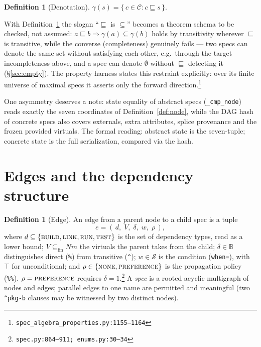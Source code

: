 \documentclass[11pt]{article}
\theoremstyle{definition}
\newtheorem{definition}[theorem]{Definition}
\theoremstyle{remark}
\newcommand{\sat}{\sqsubseteq}
\newcommand{\den}[1]{\gamma(#1)}
\newcommand{\Spec}{\mathcal{S}}
\newcommand{\Conc}{\mathcal{C}}
\newcommand{\Names}{\mathit{Nm}}
\newcommand{\code}[1]{\texttt{#1}}
\newcommand{\src}[1]{\footnote{\code{#1}}}
\newcommand{\Bool}{\mathbb{B}}
\begin{document}
\begin{definition}[Denotation]\label{def:denotation}
$\den{s} = \{\, c \in \Conc : c \sat s \,\}$.
\end{definition}

With Definition~\ref{def:denotation} the slogan ``$\sat$ is $\subseteq$''
becomes a theorem schema to be checked, not assumed: $a \sat b \Rightarrow
\den{a} \subseteq \den{b}$ holds by transitivity wherever $\sat$ is
transitive, while the converse (completeness) genuinely fails --- two specs
can denote the same set without satisfying each other, e.g.\ through the
target incompleteness above, and a spec can denote $\emptyset$ without $\sat$
detecting it (\S\ref{sec:empty}).  The property harness states this
restraint explicitly: over its finite universe of maximal specs it asserts
only the forward direction.\src{spec\_algebra\_properties.py:1155--1164}

One asymmetry deserves a note: state equality of abstract specs
(\code{\_cmp\_node}) reads exactly the seven coordinates of
Definition~\ref{def:node}, while the DAG hash of concrete specs also covers
externals, extra attributes, splice provenance and the frozen provided
virtuals.  The formal reading: abstract state is the seven-tuple; concrete
state is the full serialization, compared via the hash.

\section{Edges and the dependency structure}\label{sec:edges}

\begin{definition}[Edge]\label{def:edge}
An edge from a parent node to a child spec is a tuple
\[
  e = (\,d,\; V,\; \delta,\; w,\; \rho\,),
\]
where $d \subseteq \{\textsc{build}, \textsc{link}, \textsc{run},
\textsc{test}\}$ is the set of dependency types, read as a lower bound;
$V \subseteq_{\mathrm{fin}} \Names$ the virtuals the parent takes from the
child; $\delta \in \Bool$ distinguishes direct (\code{\%}) from transitive
(\code{\^{}}); $w \in \Spec$ is the condition (\code{when=}), with $\top$ for
unconditional; and $\rho \in \{\textsc{none}, \textsc{preference}\}$ is the
propagation policy (\code{\%\%}).
$\rho = \textsc{preference}$ requires $\delta = 1$.\src{spec.py:864--911;
enums.py:30--34}  A \emph{spec} is a rooted acyclic multigraph of nodes and
edges; parallel edges to one name are permitted and meaningful (two
\code{\^{}pkg-b} clauses may be witnessed by two distinct nodes).
\end{definition}
\end{document}
